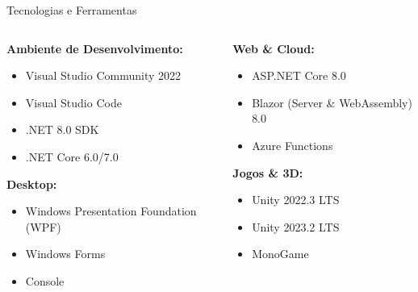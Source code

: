 \documentclass[aspectratio=169]{beamer}
\begin{document}
\begin{frame}{Tecnologias e Ferramentas}
\begin{columns}
\begin{column}{0.5\textwidth}
\textbf{Ambiente de Desenvolvimento:}
\begin{itemize}
    \item Visual Studio Community 2022
    \item Visual Studio Code
    \item .NET 8.0 SDK
    \item .NET Core 6.0/7.0
\end{itemize}

\textbf{Desktop:}
\begin{itemize}
    \item Windows Presentation Foundation (WPF)
    \item Windows Forms
    \item Console
\end{itemize}
\end{column}
\begin{column}{0.5\textwidth}
\textbf{Web \& Cloud:}
\begin{itemize}
    \item ASP.NET Core 8.0
    \item Blazor (Server \& WebAssembly) 8.0
    \item Azure Functions
\end{itemize}

\textbf{Jogos \& 3D:}
\begin{itemize}
    \item Unity 2022.3 LTS
    \item Unity 2023.2 LTS
    \item MonoGame
\end{itemize}
\end{column}
\end{columns}
\end{frame}
\end{document}
